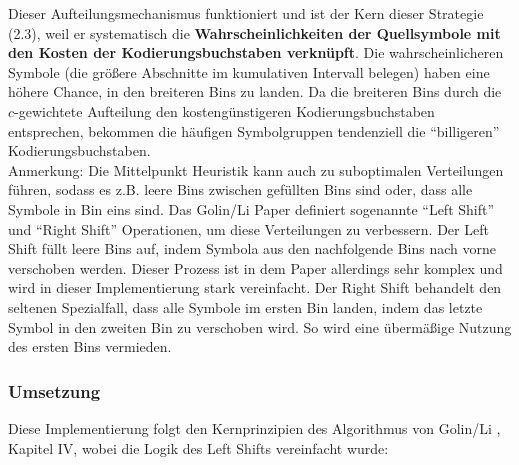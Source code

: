 \documentclass[a4paper,10pt,ngerman]{scrartcl}
\begin{document}
\newline
Dieser Aufteilungsmechanismus funktioniert und ist der Kern dieser Strategie (2.3), weil er systematisch die \textbf{Wahrscheinlichkeiten der Quellsymbole mit den Kosten der Kodierungsbuchstaben verknüpft}. Die wahrscheinlicheren Symbole (die größere Abschnitte im kumulativen Intervall belegen) haben eine höhere Chance, in den breiteren Bins zu landen. Da die breiteren Bins durch die $c$-gewichtete Aufteilung den kostengünstigeren Kodierungsbuchstaben entsprechen, bekommen die häufigen Symbolgruppen tendenziell die “billigeren” Kodierungsbuchstaben.\\
\newline
Anmerkung: Die Mittelpunkt Heuristik kann auch zu suboptimalen Verteilungen führen, sodass es z.B. leere Bins zwischen gefüllten Bins sind oder, dass alle Symbole in Bin eins sind. Das Golin/Li Paper definiert sogenannte “Left Shift” und “Right Shift” Operationen, um diese Verteilungen zu verbessern. Der Left Shift füllt leere Bins auf, indem Symbola aus den nachfolgende Bins nach vorne verschoben werden. Dieser Prozess ist in dem Paper allerdings sehr komplex und wird in dieser Implementierung stark vereinfacht. Der Right Shift behandelt den seltenen Spezialfall, dass alle Symbole im ersten Bin landen, indem das letzte Symbol in den zweiten Bin zu verschoben wird. So wird eine übermäßige Nutzung des ersten Bins vermieden. 

\subsubsection{Umsetzung}
Diese Implementierung folgt den Kernprinzipien des Algorithmus von Golin/Li \cite[Fig. 6 und Kapitel 4]{papergolinli}, Kapitel IV, wobei die Logik des Left Shifts vereinfacht wurde:\\
\newline
\end{document}
